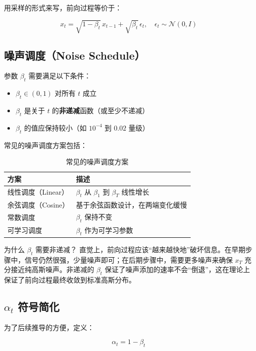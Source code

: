 用采样的形式来写，前向过程等价于：

$$x_t = \sqrt{1 - \beta_t} \, x_{t-1} + \sqrt{\beta_t} \, \epsilon_t, \quad \epsilon_t \sim \mathcal{N}(0, I)$$

\subsection{噪声调度（Noise Schedule）}

参数 $\beta_t$ 需要满足以下条件：

\begin{itemize}
    \item $\beta_t \in (0, 1)$ 对所有 $t$ 成立
    \item $\beta_t$ 是关于 $t$ 的\textbf{非递减}函数（或至少不递减）
    \item $\beta_t$ 的值应保持较小（如 $10^{-4}$ 到 $0.02$ 量级）
\end{itemize}

常见的噪声调度方案包括：

\begin{table}[H]
\centering
\begin{tabular}{ll}
\toprule
\textbf{方案} & \textbf{描述} \\
\midrule
线性调度（Linear） & $\beta_t$ 从 $\beta_1$ 到 $\beta_T$ 线性增长 \\
余弦调度（Cosine） & 基于余弦函数设计，在两端变化缓慢 \\
常数调度 & $\beta_t$ 保持不变 \\
可学习调度 & $\beta_t$ 作为可学习参数 \\
\bottomrule
\end{tabular}
\caption{常见的噪声调度方案}
\end{table}

\begin{knowledgebox}{为什么 $\beta_t$ 需要非递减？}
直觉上，前向过程应该``越来越快地''破坏信息。在早期步骤中，信号仍然很强，少量噪声即可；在后期步骤中，需要更多噪声来确保 $x_T$ 充分接近纯高斯噪声。非递减的 $\beta_t$ 保证了噪声添加的速率不会``倒退''，这在理论上保证了前向过程最终收敛到标准高斯分布。
\end{knowledgebox}

\subsection{$\alpha_t$ 符号简化}

为了后续推导的方便，定义：

$$\alpha_t = 1 - \beta_t$$

